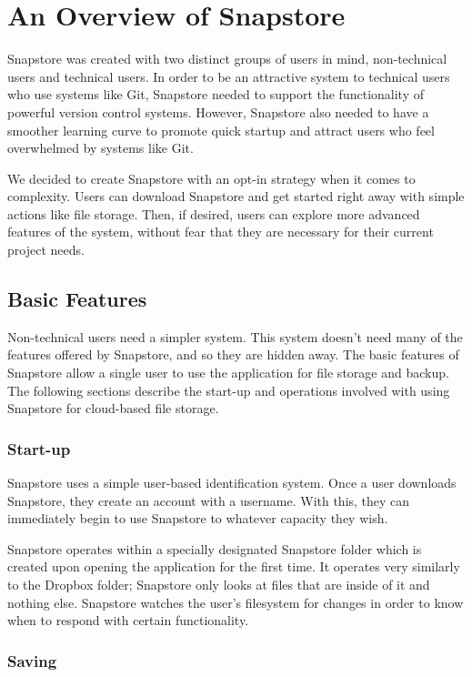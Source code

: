 \chapter{An Overview of Snapstore}

Snapstore was created with two distinct groups of users in mind, non-technical users and technical users. In order to be an attractive system to technical users who use systems like Git, Snapstore needed to support the functionality of powerful version control systems. However, Snapstore also needed to have a smoother learning curve to promote quick startup and attract users who feel overwhelmed by systems like Git. 

We decided to create Snapstore with an opt-in strategy when it comes to complexity. Users can download Snapstore and get started right away with simple actions like file storage. Then, if desired, users can explore more advanced features of the system, without fear that they are necessary for their current project needs.

\section{Basic Features}

Non-technical users need a simpler system. This system doesn't need many of the features offered by Snapstore, and so they are hidden away. The basic features of Snapstore allow a single user to use the application for file storage and backup. The following sections describe the start-up and operations involved with using Snapstore for cloud-based file storage.

\subsection{Start-up}

Snapstore uses a simple user-based identification system. Once a user downloads Snapstore, they create an account with a username. With this, they can immediately begin to use Snapstore to whatever capacity they wish.

Snapstore operates within a specially designated Snapstore folder which is created upon opening the application for the first time. It operates very similarly to the Dropbox folder; Snapstore only looks at files that are inside of it and nothing else. Snapstore watches the user's filesystem for changes in order to know when to respond with certain functionality.

\subsection{Saving}

